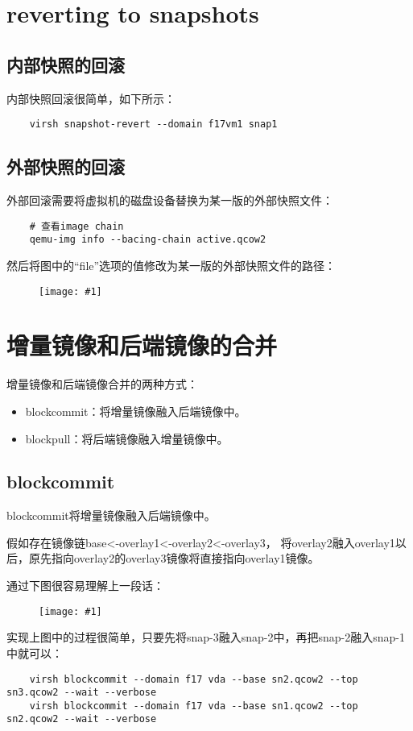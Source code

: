 \documentclass[a4paper,left=1.5cm,right=1.5cm,11pt]{article}
\newcommand{\fic}[1]{\begin{figure}[H]
		\center
		\texttt{[image: \#1]}
	\end{figure}}
\begin{document}
\clearpage

\section{reverting to snapshots}
\subsection{内部快照的回滚}
    内部快照回滚很简单，如下所示：
    \begin{lstlisting}
    virsh snapshot-revert --domain f17vm1 snap1
    \end{lstlisting}

\subsection{外部快照的回滚}
    外部回滚需要将虚拟机的磁盘设备替换为某一版的外部快照文件：
    \begin{lstlisting}
    # 查看image chain
    qemu-img info --bacing-chain active.qcow2
    \end{lstlisting}

    然后将图中的“file”选项的值修改为某一版的外部快照文件的路径：
    \fic{6.png}

\clearpage

\section{增量镜像和后端镜像的合并}
    增量镜像和后端镜像合并的两种方式：
    \begin{itemize}
        \item[1.] blockcommit：将增量镜像融入后端镜像中。
        \item[2.] blockpull：将后端镜像融入增量镜像中。
    \end{itemize}

\subsection{blockcommit}
    blockcommit将增量镜像融入后端镜像中。\par
    假如存在镜像链base<-overlay1<-overlay2<-overlay3，
    将overlay2融入overlay1以后，原先指向overlay2的overlay3镜像将直接指向overlay1镜像。\par

    通过下图很容易理解上一段话：
    \fic{4.png}

    实现上图中的过程很简单，只要先将snap-3融入snap-2中，再把snap-2融入snap-1中就可以：
    \begin{lstlisting}
    virsh blockcommit --domain f17 vda --base sn2.qcow2 --top sn3.qcow2 --wait --verbose
    virsh blockcommit --domain f17 vda --base sn1.qcow2 --top sn2.qcow2 --wait --verbose
    \end{lstlisting}
\end{document}
